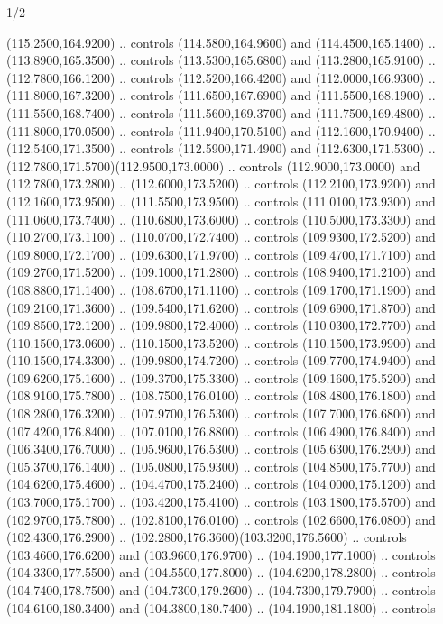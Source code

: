 \begin{flagdescription}{1/2}
\begin{scope}[xshift=\flaglength/6]
\begin{scope}[scale=0.00247\flagwidth,yshift=241mm,xshift=-27.1mm]
\begin{scope}[y=0.80pt, x=0.80pt, yscale=-0.9, xscale=1]
\begin{scope}[shift={(-53.94897,373.26853)},draw=red]
  (115.2500,164.9200) .. controls (114.5800,164.9600) and (114.4500,165.1400) ..
  (113.8900,165.3500) .. controls (113.5300,165.6800) and (113.2800,165.9100) ..
  (112.7800,166.1200) .. controls (112.5200,166.4200) and (112.0000,166.9300) ..
  (111.8000,167.3200) .. controls (111.6500,167.6900) and (111.5500,168.1900) ..
  (111.5500,168.7400) .. controls (111.5600,169.3700) and (111.7500,169.4800) ..
  (111.8000,170.0500) .. controls (111.9400,170.5100) and (112.1600,170.9400) ..
  (112.5400,171.3500) .. controls (112.5900,171.4900) and (112.6300,171.5300) ..
  (112.7800,171.5700)(112.9500,173.0000) .. controls (112.9000,173.0000) and
  (112.7800,173.2800) .. (112.6000,173.5200) .. controls (112.2100,173.9200) and
  (112.1600,173.9500) .. (111.5500,173.9500) .. controls (111.0100,173.9300) and
  (111.0600,173.7400) .. (110.6800,173.6000) .. controls (110.5000,173.3300) and
  (110.2700,173.1100) .. (110.0700,172.7400) .. controls (109.9300,172.5200) and
  (109.8000,172.1700) .. (109.6300,171.9700) .. controls (109.4700,171.7100) and
  (109.2700,171.5200) .. (109.1000,171.2800) .. controls (108.9400,171.2100) and
  (108.8800,171.1400) .. (108.6700,171.1100) .. controls (109.1700,171.1900) and
  (109.2100,171.3600) .. (109.5400,171.6200) .. controls (109.6900,171.8700) and
  (109.8500,172.1200) .. (109.9800,172.4000) .. controls (110.0300,172.7700) and
  (110.1500,173.0600) .. (110.1500,173.5200) .. controls (110.1500,173.9900) and
  (110.1500,174.3300) .. (109.9800,174.7200) .. controls (109.7700,174.9400) and
  (109.6200,175.1600) .. (109.3700,175.3300) .. controls (109.1600,175.5200) and
  (108.9100,175.7800) .. (108.7500,176.0100) .. controls (108.4800,176.1800) and
  (108.2800,176.3200) .. (107.9700,176.5300) .. controls (107.7000,176.6800) and
  (107.4200,176.8400) .. (107.0100,176.8800) .. controls (106.4900,176.8400) and
  (106.3400,176.7000) .. (105.9600,176.5300) .. controls (105.6300,176.2900) and
  (105.3700,176.1400) .. (105.0800,175.9300) .. controls (104.8500,175.7700) and
  (104.6200,175.4600) .. (104.4700,175.2400) .. controls (104.0000,175.1200) and
  (103.7000,175.1700) .. (103.4200,175.4100) .. controls (103.1800,175.5700) and
  (102.9700,175.7800) .. (102.8100,176.0100) .. controls (102.6600,176.0800) and
  (102.4300,176.2900) .. (102.2800,176.3600)(103.3200,176.5600) .. controls
  (103.4600,176.6200) and (103.9600,176.9700) .. (104.1900,177.1000) .. controls
  (104.3300,177.5500) and (104.5500,177.8000) .. (104.6200,178.2800) .. controls
  (104.7400,178.7500) and (104.7300,179.2600) .. (104.7300,179.7900) .. controls
  (104.6100,180.3400) and (104.3800,180.7400) .. (104.1900,181.1800) .. controls

\end{scope}
\end{scope}
\end{scope}
\end{scope}
\end{flagdescription}
